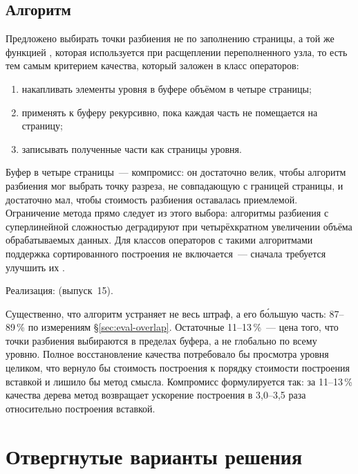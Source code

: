 \subsection{Алгоритм}

Предложено выбирать точки разбиения не по заполнению страницы, а той же
функцией , которая используется при расщеплении переполненного
узла, то есть тем самым критерием качества, который заложен в класс операторов:

\begin{enumerate}
\item накапливать элементы уровня в буфере объёмом в четыре страницы;
\item применять к буферу  рекурсивно, пока каждая часть не
      помещается на страницу;
\item записывать полученные части как страницы уровня.
\end{enumerate}

Буфер в четыре страницы~--- компромисс: он достаточно велик, чтобы алгоритм
разбиения мог выбрать точку разреза, не совпадающую с границей страницы, и
достаточно мал, чтобы стоимость разбиения оставалась приемлемой. Ограничение
метода прямо следует из этого выбора: алгоритмы разбиения с суперлинейной
сложностью деградируют при четырёхкратном увеличении объёма обрабатываемых
данных. Для классов операторов с такими алгоритмами поддержка сортированного
построения не включается~--- сначала требуется улучшить их .

Реализация:  (выпуск~15).

Существенно, что алгоритм устраняет не весь штраф, а его бо́льшую часть:
87--89\,\% по измерениям §\ref{sec:eval-overlap}. Остаточные 11--13\,\%~---
цена того, что точки разбиения выбираются в пределах буфера, а не глобально по
всему уровню. Полное восстановление качества потребовало бы просмотра уровня
целиком, что вернуло бы стоимость построения к порядку стоимости построения
вставкой и лишило бы метод смысла. Компромисс формулируется так: за 11--13\,\%
качества дерева метод возвращает ускорение построения в 3,0--3,5 раза
относительно построения вставкой.

\section{Отвергнутые варианты решения}
\label{sec:rejected-alt}

